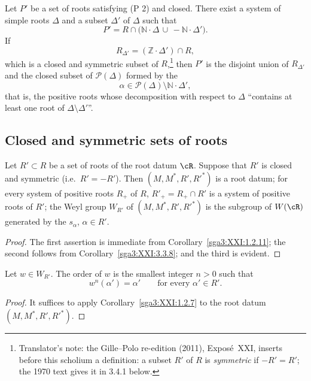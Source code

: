 \begin{scholium}\label{sga3:XXI:3.3.11}
Let \(P'\) be a set of roots satisfying (P 2) and closed. There exist a
system of simple roots \(\Delta\) and a subset \(\Delta'\) of
\(\Delta\) such that
\[
 P'=R\cap\bigl(\mathbb{N}\cdot\Delta
          \,\cup\, -\mathbb{N}\cdot\Delta'\bigr).
\]
If
\[
 R_{\Delta'}=(\mathbb{Z}\cdot\Delta')\cap R,
\]
which is a closed and symmetric subset of \(R\),\footnote{Translator's note: the Gille--Polo re-edition (2011), Exposé~XXI, inserts
before this scholium a definition: a subset \(R'\) of \(R\) is \emph{symmetric} if
\(-R'=R'\); the 1970 text gives it in 3.4.1 below.} then \(P'\) is the
disjoint union of \(R_{\Delta'}\) and the closed subset of
\(\mathscr{P}(\Delta)\) formed by the
\[
 \alpha\in\mathscr{P}(\Delta)\setminus
           \mathbb{N}\cdot\Delta',
\]
that is, the positive roots whose decomposition with respect to
\(\Delta\) ``contains at least one root of
\(\Delta\setminus\Delta'\)''.
\end{scholium}

\subsection{Closed and symmetric sets of roots}
\label{sga3:XXI:3.4}

\begin{proposition}\label{sga3:XXI:3.4.1}
Let \(R'\subset R\) be a set of roots of the root datum \(\cR\).
Suppose that \(R'\) is closed and symmetric (i.e.\ \(R'=-R'\)). Then
\((M,M^\ast,R',R'^\ast)\) is a root datum; for every system of
positive roots \(R_+\) of \(R\), \(R'_+=R_+\cap R'\) is a system of
positive roots of \(R'\); the Weyl group \(W_{R'}\) of
\((M,M^\ast,R',R'^\ast)\) is the subgroup of \(W(\cR)\) generated by
the \(s_\alpha\), \(\alpha\in R'\).
\end{proposition}

\begin{proof}
The first assertion is immediate from
Corollary~\ref{sga3:XXI:1.2.11}; the second follows from
Corollary~\ref{sga3:XXI:3.3.8}; and the third is evident.
\end{proof}

\begin{corollary}\label{sga3:XXI:3.4.2}
Let \(w\in W_{R'}\). The order of \(w\) is the smallest integer
\(n>0\) such that
\[
 w^n(\alpha')=\alpha'
 \qquad\text{for every }\alpha'\in R'.
\]
\end{corollary}

\begin{proof}
It suffices to apply Corollary~\ref{sga3:XXI:1.2.7} to the root datum
\((M,M^\ast,R',R'^\ast)\).
\end{proof}

